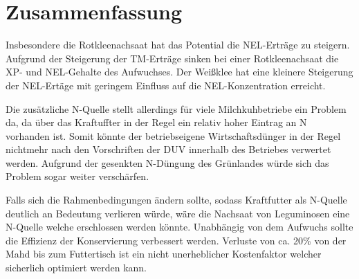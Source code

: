 
\section{Zusammenfassung}
\label{sec:Zusammenfassung}
Insbesondere die Rotkleenachsaat hat das Potential die \ac{NEL}-Erträge zu steigern.
Aufgrund der Steigerung der \ac{TM}-Erträge sinken bei einer Rotkleenachsaat die \ac{XP}- und \ac{NEL}-Gehalte des Aufwuchses.
Der Weißklee hat eine kleinere Steigerung der \ac{NEL}-Ertäge mit geringem Einfluss auf die \ac{NEL}-Konzentration erreicht.

Die zusätzliche N-Quelle stellt allerdings für viele Milchkuhbetriebe ein Problem da, da über das Kraftuffter in der Regel ein relativ hoher Eintrag an N vorhanden ist.
Somit könnte der betriebseigene Wirtschaftsdünger in der Regel nichtmehr nach den Vorschriften der \ac{DUV} innerhalb des Betriebes verwertet werden.
Aufgrund der gesenkten N-Düngung des Grünlandes würde sich das Problem sogar weiter verschärfen.

Falls sich die Rahmenbedingungen ändern sollte, sodass Kraftfutter als N-Quelle deutlich an Bedeutung verlieren würde, wäre die Nachsaat von Leguminosen eine N-Quelle welche erschlossen werden könnte.
Unabhängig von dem Aufwuchs sollte die Effizienz der Konservierung verbessert werden.
Verluste von ca. 20\% von der Mahd bis zum Futtertisch ist ein nicht unerheblicher Kostenfaktor welcher sicherlich optimiert werden kann.

